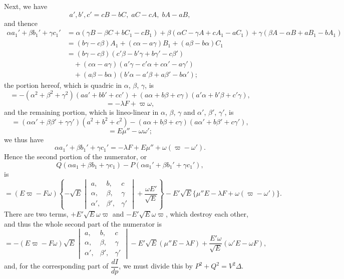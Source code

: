 \documentclass[11pt]{article}
\begin{document}
Next, we have
\[
a', b', c' = cB-bC,\; aC-cA,\; bA-aB,
\]
and thence
\begin{align*}
\alpha a_1' + \beta b_1' + \gamma c_1' &= \alpha(\gamma B - \beta C + bC_1 - cB_1) + \beta(\alpha C - \gamma A + cA_1 - aC_1) + \gamma(\beta A - \alpha B + aB_1 - bA_1)\\
&= (b\gamma-c\beta)A_1 + (c\alpha-a\gamma)B_1 + (a\beta-b\alpha)C_1\\
&= (b\gamma-c\beta)(c'\beta-b'\gamma+b\gamma'-c\beta')\\
&\quad + (c\alpha-a\gamma)(a'\gamma-c'\alpha+c\alpha'-a\gamma')\\
&\quad + (a\beta-b\alpha)(b'\alpha-a'\beta+a\beta'-b\alpha');
\end{align*}
the portion hereof, which is quadric in $\alpha$, $\beta$, $\gamma$, is
\[
= -(\alpha^2+\beta^2+\gamma^2)(aa'+bb'+cc') + (a\alpha+b\beta+c\gamma)(a'\alpha+b'\beta+c'\gamma),
\]
\[
= -\lambda F + \varpi\omega,
\]
and the remaining portion, which is lineo-linear in $\alpha$, $\beta$, $\gamma$ and $\alpha'$, $\beta'$, $\gamma'$, is
\[
= (\alpha\alpha'+\beta\beta'+\gamma\gamma')(a^2+b^2+c^2) - (a\alpha+b\beta+c\gamma)(a\alpha'+b\beta'+c\gamma'),
\]
\[
= E\mu'' - \omega\omega';
\]
we thus have
\[
\alpha a_1' + \beta b_1' + \gamma c_1' = -\lambda F + E\mu'' + \omega(\varpi-\omega').
\]
Hence the second portion of the numerator, or
\[
Q(\alpha a_1+\beta b_1+\gamma c_1) - P(\alpha a_1'+\beta b_1'+\gamma c_1'),
\]
is
\[
= (E\varpi-F\omega)\!\left\{-\sqrt{E}\begin{vmatrix} a, & b, & c \\ \alpha, & \beta, & \gamma \\ \alpha', & \beta', & \gamma' \end{vmatrix} + \frac{\omega E'}{\sqrt{E}}\right\} - E'\sqrt{E}\{\mu''E-\lambda F + \omega(\varpi-\omega')\}.
\]
There are two terms, $+E'\sqrt{E}\omega\varpi$ and $-E'\sqrt{E}\omega\varpi$, which destroy each other, and thus the whole second part of the numerator is
\[
= -(E\varpi-F\omega)\sqrt{E}
\begin{vmatrix} a, & b, & c \\ \alpha, & \beta, & \gamma \\ \alpha', & \beta', & \gamma' \end{vmatrix} - E'\sqrt{E}(\mu''E-\lambda F) + \frac{E'\omega}{\sqrt{E}}(\omega'E-\omega F),
\]
and, for the corresponding part of $\dfrac{dI}{dp}$, we must divide this by $P^2+Q^2 = V^2\Delta$.
\end{document}
